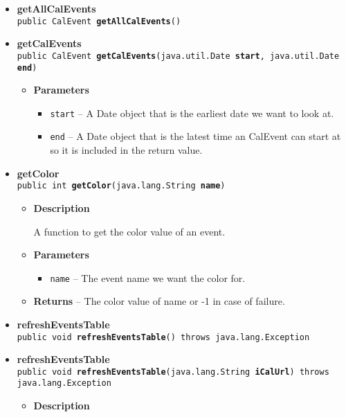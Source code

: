 \documentclass[11pt,a4paper]{report}
\begin{document}
{{{\begin{itemize}
{\begin{itemize}
{Deletes all the events in the events table of the database.
}
\end{itemize}
}%
\item{ 
{\bf  getAllCalEvents}\\
\texttt{public CalEvent\lbrack \rbrack \ {\bf  getAllCalEvents}()
\label{is.mpg.ruglan.data.Dabbi.getAllCalEvents()}}%
}%
\item{ 
{\bf  getCalEvents}\\
\texttt{public CalEvent\lbrack \rbrack \ {\bf  getCalEvents}(\texttt{java.util.Date} {\bf  start},
\texttt{java.util.Date} {\bf  end})
\label{is.mpg.ruglan.data.Dabbi.getCalEvents(java.util.Date, java.util.Date)}}%
\begin{itemize}
\item{
{\bf  Parameters}
  \begin{itemize}
   \item{
\texttt{start} -- A Date object that is the earliest date we want to look at.}
   \item{
\texttt{end} -- A Date object that is the latest time an CalEvent can start at so it is included in the return value.}
  \end{itemize}
}%
\end{itemize}
}%
\item{ 
{\bf  getColor}\\
\texttt{public int\ {\bf  getColor}(\texttt{java.lang.String} {\bf  name})
\label{is.mpg.ruglan.data.Dabbi.getColor(java.lang.String)}}%
\begin{itemize}
\item{
{\bf  Description}

A function to get the color value of an event.
}
\item{
{\bf  Parameters}
  \begin{itemize}
   \item{
\texttt{name} -- The event name we want the color for.}
  \end{itemize}
}%
\item{{\bf  Returns} -- 
The color value of name or -1 in case of failure. 
}%
\end{itemize}
}%
\item{ 
{\bf  refreshEventsTable}\\
\texttt{public void\ {\bf  refreshEventsTable}() throws java.lang.Exception
\label{is.mpg.ruglan.data.Dabbi.refreshEventsTable()}}%
}%
\item{ 
{\bf  refreshEventsTable}\\
\texttt{public void\ {\bf  refreshEventsTable}(\texttt{java.lang.String} {\bf  iCalUrl}) throws java.lang.Exception
\label{is.mpg.ruglan.data.Dabbi.refreshEventsTable(java.lang.String)}}%
\begin{itemize}
\item{
{\bf  Description}

}
\end{itemize}}
\end{itemize}}}}
\end{document}

